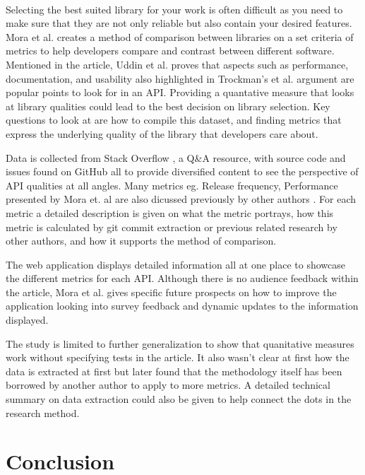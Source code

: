\documentclass[12pt]{article}
\begin{document}
\paragraph{}
Selecting the best suited library for your work is often difficult as you need to make sure that they are not only reliable but also contain your desired features.
Mora et al. \cite{metrics} creates a method of comparison between libraries on a set criteria of metrics to help developers
compare and contrast between different software. Mentioned in the article, Uddin et al. \cite{analogical} proves that aspects
such as performance, documentation, and usability also highlighted in Trockman's et al. \cite{githubbadges} argument are
popular points to look for in an API.
Providing a quantative measure that looks at library qualities could lead to the best decision on library selection.
Key questions to look at are how to compile this dataset, and finding metrics that express the underlying quality of the library that developers care about.

Data is collected from Stack Overflow \cite{stackoverflow}, a Q\&A resource, with source code and issues found on GitHub \cite{github} all to provide
diversified content to see the perspective of API qualities at all angles. Many metrics eg. Release frequency, Performance presented by Mora et. al \cite{metrics} are also
dicussed previously by other authors \cite{apiwave,analogical,githubbadges,opinerarticle}.
For each metric a detailed description is given on what the metric portrays, how this metric is calculated by git commit extraction or previous related research by other authors,
and how it supports the method of comparison.

The web application displays detailed information all at one place to showcase the different metrics for each API. 
Although there is no audience feedback within the article, Mora et al. \cite{metrics} gives specific future prospects on how
to improve the application looking into survey feedback and dynamic updates to the information displayed. 

The study is limited to further generalization to show that quanitative measures work without specifying tests in the article. 
It also wasn't clear at first how the data is extracted at first but later found that the methodology itself has been borrowed by another author to apply to more metrics.
A detailed technical summary on data extraction could also be given to help connect the dots in the research method.


\newpage 
\section{Conclusion}
\end{document}
